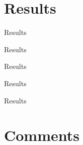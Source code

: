 \documentclass[aspectratio=169,xcolor=dvipsnames]{beamer}
\begin{document}
 \section{Results}
\begin{frame}{Results}


\end{frame}


\begin{frame}{Results}


\end{frame}


\begin{frame}{Results}


\end{frame}


\begin{frame}{Results}


\end{frame}


\begin{frame}{Results}


\end{frame}





 \section{Comments}
\end{document}
